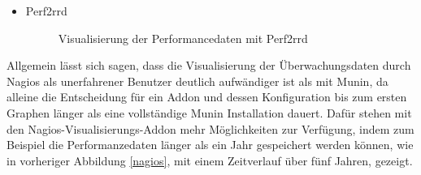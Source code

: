 \begin{itemize}
\item Perf2rrd

\begin{figure}[ht]
	\centering
		\caption{Visualisierung der Performancedaten mit Perf2rrd}
		\label{perf2rdd}
\end{figure}
\end{itemize}

Allgemein lässt sich sagen, dass die Visualisierung der Überwachungsdaten durch Nagios als unerfahrener Benutzer deutlich aufwändiger ist als mit Munin, da alleine die Entscheidung für ein Addon und dessen Konfiguration bis zum ersten Graphen länger als eine vollständige Munin Installation dauert.
Dafür stehen mit den Nagios-Visualisierungs-Addon mehr Möglichkeiten zur Verfügung, indem zum Beispiel die Performanzedaten länger als ein Jahr gespeichert werden können, wie in vorheriger Abbildung \ref{nagios}, mit einem Zeitverlauf über fünf Jahren, gezeigt.

